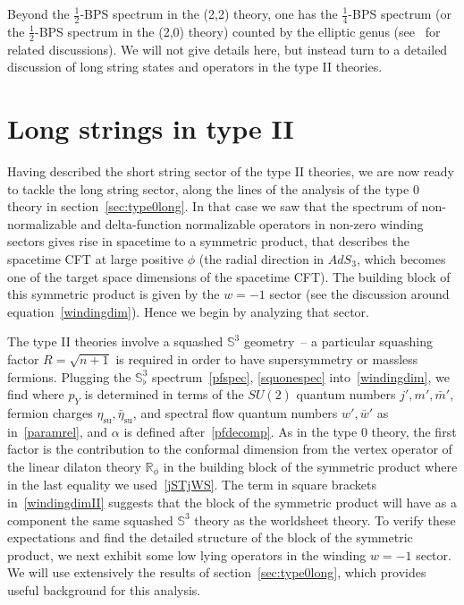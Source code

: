 \documentclass[12pt]{article}
\def\su{\text{su}}
\def\sutwo{{SU(2)}}
\def\sqsphere{{\bS^3_\flat}}
\def\osc{{\rm osc}}
\def\half{\frac12}
\def\coeff#1#2{{\textstyle \frac{#1}{#2}}}
\def\hf{\coeff12}
\newcommand{\bR}{{\mathbb R}}
\newcommand{\bS}{{\mathbb S}}
\numberwithin{equation}{section}
\def\coeff#1#2{{\textstyle{\frac{#1}{ #2}}}}
\def\half{\frac12}
\def\hf{{\textstyle\half}}
\def\mbar{{\bar m}}
\begin{document}
Beyond the $\hf$-BPS spectrum in the (2,2) theory, one has the $\frac14$-BPS spectrum (or the $\hf$-BPS spectrum in the (2,0) theory) counted by the elliptic genus (see~ for related discussions).  We will not give details here, but instead turn to a detailed discussion of long string states and operators in the type II theories.





\section{Long strings in type II}
\label{sec:typeIIlong}

Having described the short string sector of the type II theories, we are now ready to tackle the long string sector, along the lines of the analysis of the type 0 theory in section~\ref{sec:type0long}. In that case we saw that the spectrum of non-normalizable and delta-function normalizable operators in non-zero winding sectors gives rise in spacetime to a symmetric product, that describes the spacetime CFT at large positive $\phi$ (the radial direction in $AdS_3$, which becomes one of the target space dimensions of the spacetime CFT). The building block of this symmetric product is given by the $w=-1$ sector (see the discussion around equation~\eqref{windingdim}). Hence we begin by analyzing that sector.


The type II theories involve a squashed $\bS^3$ geometry~-- a particular squashing factor $R=\sqrt{n+1}$ is required in order to have supersymmetry or massless fermions.  Plugging the $\sqsphere$ spectrum~\eqref{pfspec}, \eqref{squonespec} into~\eqref{windingdim}, we find
\eqn[windingdimII]{
h_1 = -\frac{j(j-1)}{k} + \bigg[\frac{j'(j'+1)-(m'+\alpha)^2}{n} +\frac{\alpha^2}{2} + \frac{p_Y^{\,2}}{2}\bigg] + \big(N_\osc-\delta_0\big)+\frac k4 ~,
}
where $p_Y$ is determined in terms of the $\sutwo$ quantum numbers $j',m',\mbar'$, fermion charges $\eta_\su,\bar\eta_\su$, and spectral flow quantum numbers $w',\bar w'$ as in~\eqref{paramrel}, and $\alpha$ is defined after~\eqref{pfdecomp}. As in the type 0 theory, the first factor is the contribution to the conformal dimension from the vertex operator of the linear dilaton theory $\bR_\phi$ in the building block of the symmetric product
\eqn[expII]{
e^{\beta\phi} 
~~,~~~~
\beta=-\frac{Q_\ell}{2} + Q\Big(j-\half\Big)
=-\frac{Q_\ell}{2}+Q_\ell\Big(j_{\rm st}-\half\Big) ~,
}
where in the last equality we used~\eqref{jSTjWS}. The term in square brackets in~\eqref{windingdimII} suggests that the block of the symmetric product will have as a component the same squashed $\bS^3$ theory as the worldsheet theory. To verify these expectations and find the detailed structure of the block of the symmetric product, we next exhibit some low lying operators in the winding $w=-1$ sector. We will use extensively the results of section~\ref{sec:type0long}, which provides useful background for this analysis.
\end{document}
